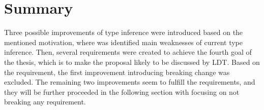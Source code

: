 \section{Summary}

Three possible improvements of type inference were introduced based on the mentioned motivation, where was identified main weaknesses of current type inference. 
Then, several requirements were created to achieve the fourth goal of the thesis, which is to make the proposal likely to be discussed by \ac{LDT}. 
Based on the requirement, the first improvement introducing breaking change was excluded. 
The remaining two improvements seem to fulfill the requirements, and they will be further proceeded in the following section with focusing on not breaking any requirement.